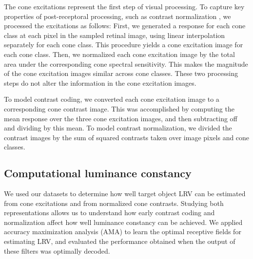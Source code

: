 \documentclass{jov}
\begin{document}
The cone excitations represent the first step of visual processing. %
To capture key properties of post-receptoral processing, such as contrast normalization \cite{heeger1992normalization,albrecht1991motion,carandini2012normalization}, 
we processed the excitations as follows:
First, we generated a response for each cone class at each pixel in the sampled retinal image, using linear interpolation separately for each cone class. This procedure yields a cone excitation image for each cone class.
Then, we normalized each cone excitation image by the total area under the corresponding cone spectral sensitivity.
This makes the magnitude of the cone excitation images similar across cone classes.
These two processing steps do not alter the information in the cone excitation images. 

To model contrast coding, we converted each cone excitation image to a corresponding cone contrast image.
This was accomplished by computing the mean response over the three cone excitation images, and then subtracting off and dividing by this mean.
To model contrast normalization, we divided the contrast images by the sum of squared contrasts taken over image pixels and cone classes.


\subsection{Computational luminance constancy} \label{method:SupervisedLearning}
We used our datasets to determine how well target object LRV can be estimated from cone excitations and from normalized cone contrasts.
Studying both representations allows us to understand how early contrast coding and normalization affect how well luminance constancy can be achieved.
We applied accuracy maximization analysis (AMA) to learn the optimal receptive fields for estimating LRV,
and evaluated the performance obtained when the output of these filters was optimally decoded.
\end{document}
